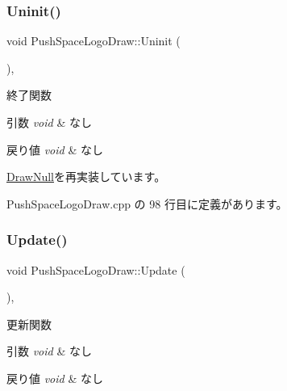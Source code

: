 \subsubsection{\texorpdfstring{Uninit()}{Uninit()}}
{\footnotesize\ttfamily void Push\+Space\+Logo\+Draw\+::\+Uninit (\begin{DoxyParamCaption}{ }\end{DoxyParamCaption})\hspace{0.3cm}{\ttfamily [override]}, {\ttfamily [virtual]}}



終了関数 


\begin{DoxyParams}{引数}
{\em void} & なし \\
\hline
\end{DoxyParams}

\begin{DoxyRetVals}{戻り値}
{\em void} & なし \\
\hline
\end{DoxyRetVals}


\mbox{\hyperlink{class_draw_null_a6e81d63efab7333e8d0e8af99362a4d9}{Draw\+Null}}を再実装しています。



 Push\+Space\+Logo\+Draw.\+cpp の 98 行目に定義があります。

\mbox{\label{class_push_space_logo_draw_a75248e42d5b677c81169be478b59141f}} 
\subsubsection{\texorpdfstring{Update()}{Update()}}
{\footnotesize\ttfamily void Push\+Space\+Logo\+Draw\+::\+Update (\begin{DoxyParamCaption}{ }\end{DoxyParamCaption})\hspace{0.3cm}{\ttfamily [override]}, {\ttfamily [virtual]}}



更新関数 


\begin{DoxyParams}{引数}
{\em void} & なし \\
\hline
\end{DoxyParams}

\begin{DoxyRetVals}{戻り値}
{\em void} & なし \\
\hline
\end{DoxyRetVals}


